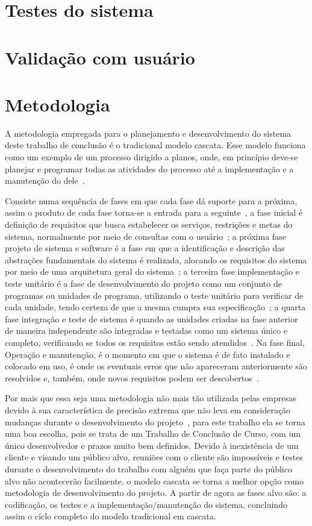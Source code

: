 \chapter{Testes do sistema}

\chapter{Validação com usuário}

\chapter{Metodologia}

A metodologia empregada para o planejamento e desenvolvimento do sistema deste trabalho de conclusão é o tradicional modelo cascata.
Esse modelo funciona como um exemplo de um processo dirigido a planos, onde, em princípio deve-se planejar e programar todas as atividades do processo até a implementação e a manutenção do dele~\cite{SOMMERVILLE1}.

Consiste numa sequência de fases em que cada fase dá suporte para a próxima, assim o produto de cada fase torna-se a entrada para a seguinte~\cite{BALTZAN1}, a fase inicial é definição de requisitos que busca estabelecer os serviços, restrições e metas do sistema, normalmente por meio de consultas com o usuário~\cite{SOMMERVILLE1}; a próxima fase projeto de sistema e software é a fase em que a identificação e descrição das abstrações fundamentais do sistema é realizada, alocando os requisitos do sistema por meio de uma arquitetura geral do sistema~\cite{SOMMERVILLE1}; a terceira fase implementação e teste unitário é a fase de desenvolvimento do projeto como um conjunto de programas ou unidades de programa, utilizando o teste unitário para verificar de cada unidade, tendo certeza de que a mesma cumpra sua especificação~\cite{SOMMERVILLE1}; a quarta fase integração e teste de sistema é quando as unidades criadas na fase anterior de maneira independente são integradas e testadas como um sistema único e completo, verificando se todos os requisitos estão sendo atendidos~\cite{SOMMERVILLE1}.
Na fase final, Operação e manutenção, é o momento em que o sistema é de fato instalado e colocado em uso, é onde os eventuais erros que não apareceram anteriormente são resolvidos e, também, onde novos requisitos podem ser descobertos~\cite{SOMMERVILLE1}. 

Por mais que essa seja uma metodologia não mais tão utilizada pelas empresas devido à sua característica de precisão extrema que não leva em consideração mudanças durante o desenvolvimento do projeto~\cite{BALTZAN1}, para este trabalho ela se torna uma boa escolha, pois se trata de um Trabalho de Conclusão de Curso, com um único desenvolvedor e prazos muito bem definidos.
Devido à inexistência de um cliente e visando um público alvo, reuniões com o cliente são impossíveis e testes durante o desenvolvimento do trabalho com alguém que faça parte do público alvo não acontecerão facilmente, o modelo cascata se torna a melhor opção como metodologia de desenvolvimento do projeto. A partir de agora as fases alvo são: a codificação, os testes e a implementação/manutenção do sistema, concluindo assim o ciclo completo do modelo tradicional em cascata.

